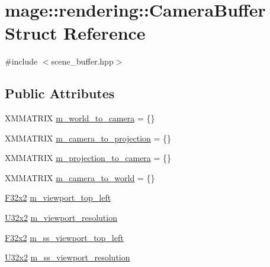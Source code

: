 \hypertarget{structmage_1_1rendering_1_1_camera_buffer}{}\section{mage\+:\+:rendering\+:\+:Camera\+Buffer Struct Reference}
\label{structmage_1_1rendering_1_1_camera_buffer}


{\ttfamily \#include $<$scene\+\_\+buffer.\+hpp$>$}

\subsection*{Public Attributes}
\begin{DoxyCompactItemize}
\item 
X\+M\+M\+A\+T\+R\+IX \mbox{\hyperlink{structmage_1_1rendering_1_1_camera_buffer_af1ceff883dcc383ce10f2165a5a9a061}{m\+\_\+world\+\_\+to\+\_\+camera}} = \{\}
\item 
X\+M\+M\+A\+T\+R\+IX \mbox{\hyperlink{structmage_1_1rendering_1_1_camera_buffer_a75669aa0916514b1d414e5a2f7c72c75}{m\+\_\+camera\+\_\+to\+\_\+projection}} = \{\}
\item 
X\+M\+M\+A\+T\+R\+IX \mbox{\hyperlink{structmage_1_1rendering_1_1_camera_buffer_a9cb9e0e4005d55b72668bbdcf4a27218}{m\+\_\+projection\+\_\+to\+\_\+camera}} = \{\}
\item 
X\+M\+M\+A\+T\+R\+IX \mbox{\hyperlink{structmage_1_1rendering_1_1_camera_buffer_a0633cfc689f2a097783ecc1626b94590}{m\+\_\+camera\+\_\+to\+\_\+world}} = \{\}
\item 
\mbox{\hyperlink{namespacemage_aee4759dedc8def6c6dec26b5c7eddf29}{F32x2}} \mbox{\hyperlink{structmage_1_1rendering_1_1_camera_buffer_a074146702a680ce9102dd9cf84e74be3}{m\+\_\+viewport\+\_\+top\+\_\+left}}
\item 
\mbox{\hyperlink{namespacemage_ae5e7ccf8a1785baaacf57b3a0f4324e2}{U32x2}} \mbox{\hyperlink{structmage_1_1rendering_1_1_camera_buffer_a433bdb3d8b4e86fcd04fdb2b794bd0f7}{m\+\_\+viewport\+\_\+resolution}}
\item 
\mbox{\hyperlink{namespacemage_aee4759dedc8def6c6dec26b5c7eddf29}{F32x2}} \mbox{\hyperlink{structmage_1_1rendering_1_1_camera_buffer_a7410f2408daa4e4a69e145eb8d31a2d7}{m\+\_\+ss\+\_\+viewport\+\_\+top\+\_\+left}}
\item 
\mbox{\hyperlink{namespacemage_ae5e7ccf8a1785baaacf57b3a0f4324e2}{U32x2}} \mbox{\hyperlink{structmage_1_1rendering_1_1_camera_buffer_a96b17352187228ee2265be33d3f2d159}{m\+\_\+ss\+\_\+viewport\+\_\+resolution}}

\end{DoxyCompactItemize}
